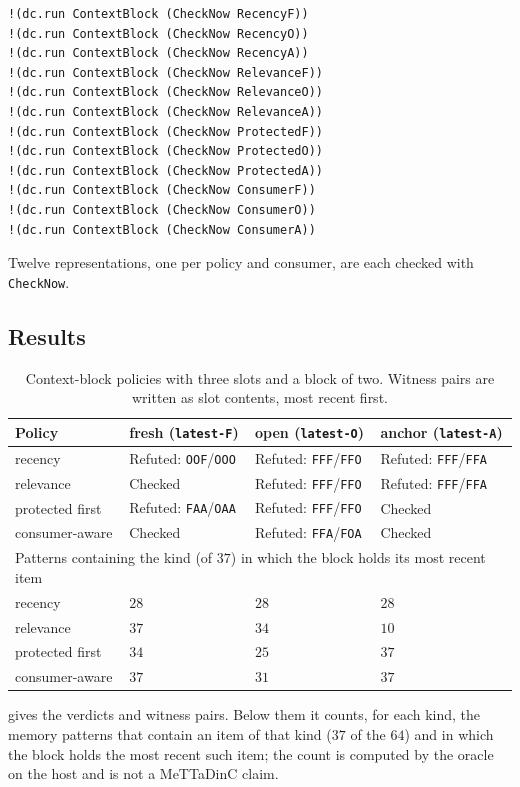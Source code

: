 \documentclass[11pt]{article}
\newcommand{\code}[1]{\texttt{#1}}
\theoremstyle{definition}
\theoremstyle{plain}
\begin{document}
\begin{lstlisting}[style=mettamod]
!(dc.run ContextBlock (CheckNow RecencyF))
!(dc.run ContextBlock (CheckNow RecencyO))
!(dc.run ContextBlock (CheckNow RecencyA))
!(dc.run ContextBlock (CheckNow RelevanceF))
!(dc.run ContextBlock (CheckNow RelevanceO))
!(dc.run ContextBlock (CheckNow RelevanceA))
!(dc.run ContextBlock (CheckNow ProtectedF))
!(dc.run ContextBlock (CheckNow ProtectedO))
!(dc.run ContextBlock (CheckNow ProtectedA))
!(dc.run ContextBlock (CheckNow ConsumerF))
!(dc.run ContextBlock (CheckNow ConsumerO))
!(dc.run ContextBlock (CheckNow ConsumerA))
\end{lstlisting}
Twelve representations, one per policy and consumer, are each checked with \code{CheckNow}.

\subsection{Results}

\begin{table}[ht]
\centering\small
\begin{tabularx}{\textwidth}{lXXX}
\toprule
Policy & fresh (\code{latest-F}) & open (\code{latest-O}) & anchor (\code{latest-A})\\
\midrule
recency & Refuted: \code{OOF}/\code{OOO} & Refuted: \code{FFF}/\code{FFO} & Refuted: \code{FFF}/\code{FFA}\\
relevance & Checked & Refuted: \code{FFF}/\code{FFO} & Refuted: \code{FFF}/\code{FFA}\\
protected first & Refuted: \code{FAA}/\code{OAA} & Refuted: \code{FFF}/\code{FFO} & Checked\\
consumer-aware & Checked & Refuted: \code{FFA}/\code{FOA} & Checked\\
\midrule
\multicolumn{4}{l}{Patterns containing the kind (of $37$) in which the block holds its most recent item}\\
\midrule
recency & $28$ & $28$ & $28$\\
relevance & $37$ & $34$ & $10$\\
protected first & $34$ & $25$ & $37$\\
consumer-aware & $37$ & $31$ & $37$\\
\bottomrule
\end{tabularx}
\caption{Context-block policies with three slots and a block of two. Witness pairs are written as
slot contents, most recent first.}\label{tab:p2}
\end{table}

 gives the verdicts and witness pairs. Below them it counts, for each kind, the
memory patterns that contain an item of that kind ($37$ of the $64$) and in which the block holds
the most recent such item; the count is computed by the oracle on the host and is not a MeTTaDinC
claim.
\end{document}
